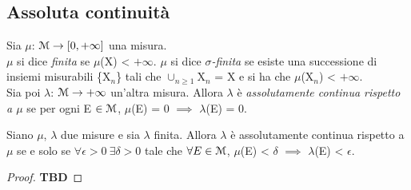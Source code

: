 \documentclass[Completo.tex]{subfiles}
\begin{document}
\subsection{Assoluta continuità}
\begin{Def}
	Sia $\mu$: $\eu[M] \ra [0, +\infty]$ una misura. \\
	$\mu$ si dice \textit{finita} se $\mu$(X) < $+\infty$. $\mu$ si dice \textit{$\sigma$-finita} se esiste una successione di insiemi misurabili \{X$_n$\} tali che $\cup_{n\geq1}$X$_n$ = X e si ha che $\mu$(X$_n$) < $+\infty$. \\
	Sia poi $\lambda$: $\eu[M] \ra +\infty$ un'altra misura. Allora $\lambda$ è \textit{assolutamente continua rispetto a $\mu$} se per ogni E $\in \eu[M]$, $\mu$(E) = 0 $\implies$ $\lambda$(E) = 0.
\end{Def}
\begin{Th}
	Siano $\mu$, $\lambda$ due misure e sia $\lambda$ finita. Allora $\lambda$ è assolutamente continua rispetto a $\mu$ se e solo se $\forall \epsilon > 0 \ \exists \delta > 0$ tale che $\forall E \in \eu[M]$, $\mu$(E) < $\delta$ $\implies$ $\lambda$(E) < $\epsilon$.
\end{Th}
\begin{proof}
	\textbf{TBD}
\end{proof}
\end{document}
